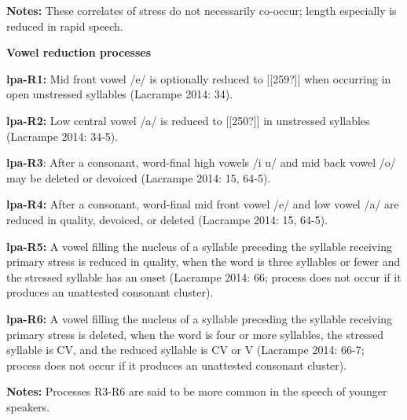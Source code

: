 \begin{styleBody}
\textbf{Notes:} These correlates of stress do not necessarily co-occur; length especially is reduced in rapid speech.
\end{styleBody}

\begin{styleBody}
\textbf{Vowel reduction processes}
\end{styleBody}

\begin{styleBody}
\textbf{lpa-R1:} Mid front vowel /e/ is optionally reduced to [[259?]] when occurring in open unstressed syllables (Lacrampe 2014: 34).
\end{styleBody}

\begin{styleBody}
\textbf{lpa-R2:} Low central vowel /a/ is reduced to [[250?]] in unstressed syllables (Lacrampe 2014: 34-5).
\end{styleBody}

\begin{styleBody}
\textbf{lpa-R3}: After a consonant, word-final high vowels /i u/ and mid back vowel /o/ may be deleted or devoiced (Lacrampe 2014: 15, 64-5).
\end{styleBody}

\begin{styleBody}
\textbf{lpa-R4:} After a consonant, word-final mid front vowel /e/ and low vowel /a/ are reduced in quality, devoiced, or deleted (Lacrampe 2014: 15, 64-5).
\end{styleBody}

\begin{styleBody}
\textbf{lpa-R5:} A vowel filling the nucleus of a syllable preceding the syllable receiving primary stress is reduced in quality, when the word is three syllables or fewer and the stressed syllable has an onset (Lacrampe 2014: 66; process does not occur if it produces an unattested consonant cluster).
\end{styleBody}

\begin{styleBody}
\textbf{lpa-R6:} A vowel filling the nucleus of a syllable preceding the syllable receiving primary stress is deleted, when the word is four or more syllables, the stressed syllable is CV, and the reduced syllable is CV or V (Lacrampe 2014: 66-7; process does not occur if it produces an unattested consonant cluster).
\end{styleBody}

\begin{styleBody}
\textbf{Notes:} Processes R3-R6 are said to be more common in the speech of younger speakers.
\end{styleBody}

